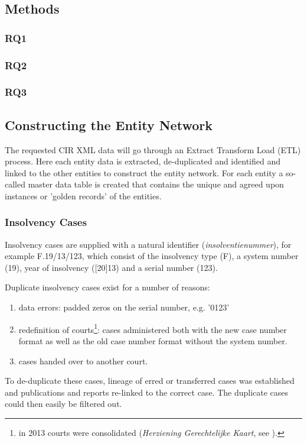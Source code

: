 \subsection{Methods}
\subsubsection{RQ1}
\subsubsection{RQ2}
\subsubsection{RQ3}
\subsection{Constructing the Entity Network}
The requested CIR XML data will go through an Extract Transform Load (ETL) process. Here each entity data is extracted, de-duplicated and identified and linked to the other entities to construct the entity network. For each entity a so-called master data table is created that contains the unique and agreed upon instances or 'golden records' of the entities. 

\subsubsection{Insolvency Cases}
Insolvency cases are supplied with a natural identifier (\textit{insolventienummer}), for example F.19/13/123, which consist of the insolvency type (F), a system number (19), year of insolvency ([20]13) and a serial number (123). 

Duplicate insolvency cases exist for a number of reasons:
\begin{enumerate}
	\item data errors: padded zeros on the serial number, e.g. '0123'
	\item redefinition of courts\footnote{in 2013 courts were consolidated (\textit{Herziening Gerechtelijke Kaart}, see \cite{om:1}).}: cases administered both with the new case number format as well as the old case number format without the system number.
	\item cases handed over to another court.
\end{enumerate}
To de-duplicate these cases, lineage of erred or transferred cases was established and publications and reports re-linked to the correct case. The duplicate cases could then easily be filtered out.

